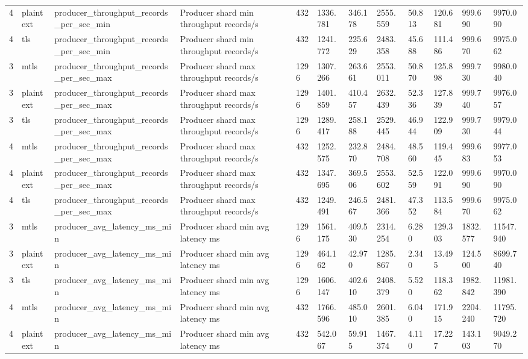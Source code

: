\begin{longtable}{llllllllllll}
4 & plaintext & producer\_throughput\_records\_per\_sec\_min & Producer shard min throughput records/s & 432 & 1336.781 & 346.178 & 2555.559 & 50.813 & 120.681 & 999.690 & 9970.090 \\
4 & tls & producer\_throughput\_records\_per\_sec\_min & Producer shard min throughput records/s & 432 & 1241.772 & 225.629 & 2483.358 & 45.688 & 111.486 & 999.670 & 9975.062 \\
3 & mtls & producer\_throughput\_records\_per\_sec\_max & Producer shard max throughput records/s & 1296 & 1307.266 & 263.661 & 2553.011 & 50.870 & 125.898 & 999.730 & 9980.040 \\
3 & plaintext & producer\_throughput\_records\_per\_sec\_max & Producer shard max throughput records/s & 1296 & 1401.859 & 410.457 & 2632.439 & 52.336 & 127.839 & 999.740 & 9976.057 \\
3 & tls & producer\_throughput\_records\_per\_sec\_max & Producer shard max throughput records/s & 1296 & 1289.417 & 258.188 & 2529.445 & 46.944 & 122.909 & 999.730 & 9979.044 \\
4 & mtls & producer\_throughput\_records\_per\_sec\_max & Producer shard max throughput records/s & 432 & 1252.575 & 232.870 & 2484.708 & 48.560 & 119.445 & 999.683 & 9977.053 \\
4 & plaintext & producer\_throughput\_records\_per\_sec\_max & Producer shard max throughput records/s & 432 & 1347.695 & 369.506 & 2553.602 & 52.559 & 122.091 & 999.690 & 9970.090 \\
4 & tls & producer\_throughput\_records\_per\_sec\_max & Producer shard max throughput records/s & 432 & 1249.491 & 246.567 & 2481.366 & 47.352 & 113.584 & 999.670 & 9975.062 \\
3 & mtls & producer\_avg\_latency\_ms\_min & Producer shard min avg latency ms & 1296 & 1561.175 & 409.530 & 2314.254 & 6.280 & 129.303 & 1832.577 & 11547.940 \\
3 & plaintext & producer\_avg\_latency\_ms\_min & Producer shard min avg latency ms & 1296 & 464.162 & 42.970 & 1285.867 & 2.340 & 13.495 & 124.500 & 8699.740 \\
3 & tls & producer\_avg\_latency\_ms\_min & Producer shard min avg latency ms & 1296 & 1606.147 & 402.610 & 2408.379 & 5.520 & 118.362 & 1982.842 & 11981.390 \\
4 & mtls & producer\_avg\_latency\_ms\_min & Producer shard min avg latency ms & 432 & 1766.596 & 485.010 & 2601.385 & 6.040 & 171.915 & 2204.240 & 11795.720 \\
4 & plaintext & producer\_avg\_latency\_ms\_min & Producer shard min avg latency ms & 432 & 542.067 & 59.915 & 1467.374 & 4.110 & 17.227 & 143.103 & 9049.270 \\

\end{longtable}
